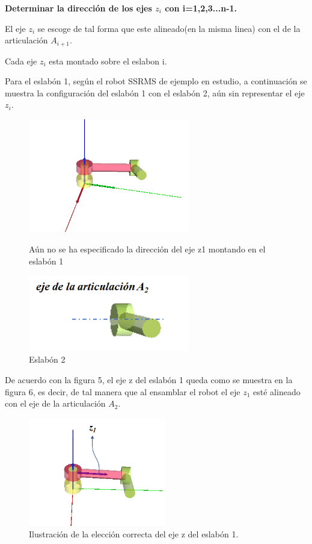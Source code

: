 \documentclass[12pt,a4paper]{report}
\begin{document}
\textbf{Determinar la dirección de los ejes $z_{i}$ con i=1,2,3...n-1.}

 El eje $z_{i}$ se escoge de tal forma que este alineado(en la misma linea) con el de la articulación $A_{i+1}$.
 
 Cada eje $z_{i}$ esta montado sobre el eslabon i.
 
 Para el eslabón 1, según el robot SSRMS de ejemplo en estudio, a continuación se muestra la configuración del eslabón 1 con el eslabón 2, aún sin representar el eje $z_{i}$. 
\begin{figure}[hbtp]
\centering
\includegraphics[width=7cm]{4.png}
\caption{Aún no se ha especificado la dirección del eje z1 montando en el eslabón 1}
\includegraphics[width=7cm]{5.png}
\caption{Eslabón 2}
\end{figure}
De acuerdo con la figura 5, el eje z del eslabón 1 queda como se muestra en la figura 6, es decir, de tal manera que al ensamblar el robot el eje $z_{1}$ esté alineado con el eje de la articulación $A_{2}$.
\begin{figure}
\centering
\includegraphics[width=6cm]{6.png}
\caption{Ilustración de la elección correcta del eje z del eslabón 1.}
\end{figure}
\\\\
\end{document}
